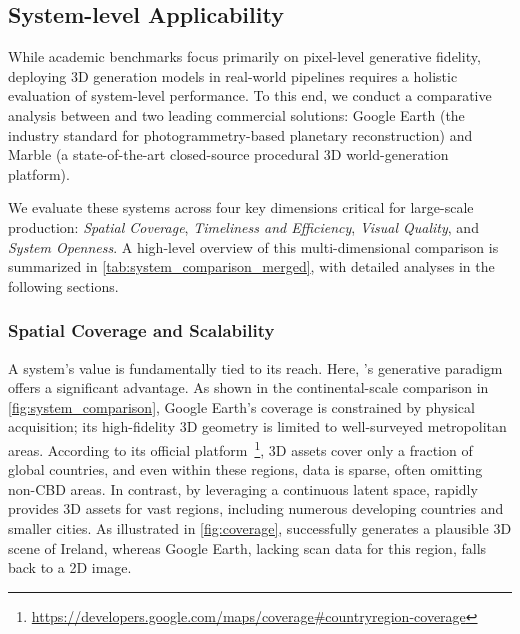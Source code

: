 

\subsection{System-level Applicability}
\label{sec:system_applicability}

While academic benchmarks focus primarily on pixel-level generative fidelity, deploying 3D generation models in real-world pipelines requires a holistic evaluation of system-level performance. To this end, we conduct a comparative analysis between \method{} and two leading commercial solutions: Google Earth (the industry standard for photogrammetry-based planetary reconstruction) and Marble (a state-of-the-art closed-source procedural 3D world-generation platform).

We evaluate these systems across four key dimensions critical for large-scale production: \textit{Spatial Coverage}, \textit{Timeliness and Efficiency}, \textit{Visual Quality}, and \textit{System Openness}. A high-level overview of this multi-dimensional comparison is summarized in \cref{tab:system_comparison_merged}, with detailed analyses in the following sections.



\subsubsection{Spatial Coverage and Scalability}
A system's value is fundamentally tied to its reach. Here, \method{}'s generative paradigm offers a significant advantage. As shown in the continental-scale comparison in \cref{fig:system_comparison}, Google Earth's coverage is constrained by physical acquisition; its high-fidelity 3D geometry is limited to well-surveyed metropolitan areas. According to its official platform~\footnote{\url{https://developers.google.com/maps/coverage\#countryregion-coverage}}, 3D assets cover only a fraction of global countries, and even within these regions, data is sparse, often omitting non-CBD areas. In contrast, by leveraging a continuous latent space, \method{} rapidly provides 3D assets for vast regions, including numerous developing countries and smaller cities. As illustrated in \cref{fig:coverage}, \method{} successfully generates a plausible 3D scene of Ireland, whereas Google Earth, lacking scan data for this region, falls back to a 2D image.



